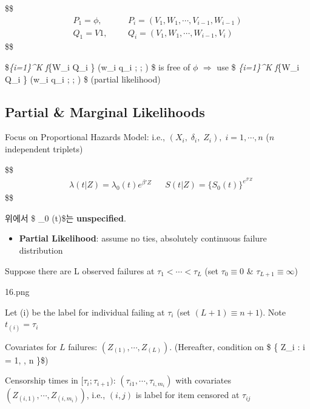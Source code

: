 \documentclass[
]{book}
\providecommand{\tightlist}{%
  \setlength{\itemsep}{0pt}\setlength{\parskip}{0pt}}
\theoremstyle{definition}
\theoremstyle{definition}
\theoremstyle{definition}
\theoremstyle{definition}
\theoremstyle{remark}
\begin{document}
\$\$
\begin{align}


P_1 = \phi,& && P_i =(V_1 , W_1 , \cdots, V_{i-1} , W_{i-1})
\\
Q_1 = V1,& && Q_i =(V_1 , W_1 , \cdots , W_{i-1}, V_i)

\end{align}
\$\$

\$\prod\emph{\{i=1\}\^{}K f}\{W\_i \textbar{} Q\_i \} (w\_i \Big \textbar{} q\_i ; ; \theta) \$ is free of \(\phi\) \(\Rightarrow\) use \$ \prod\emph{\{i=1\}\^{}K f}\{W\_i \textbar{} Q\_i \} (w\_i \Big \textbar{} q\_i ; ; \beta) \$ (partial likelihood)

\hypertarget{partial-marginal-likelihoods}{%
\subsection{Partial \& Marginal Likelihoods}\label{partial-marginal-likelihoods}}

Focus on Proportional Hazards Model: i.e., \((X_i, \; \delta_i, \; Z_i), \; i = 1, \cdots, n\) (\(n\) independent triplets)

\$\$
\begin{align}

&\lambda(t \Big | Z ) = \lambda_0 (t) e^{\beta ' Z} &&S(t \Big | Z) = \Big \{ S_0(t) \Big \}^{e^{\beta ' Z}} \tag{1}

\end{align}
\$\$

위에서 \$ \lambda\_0 (t)\$는 \textbf{unspecified}.

\begin{itemize}
\tightlist
\item
  \textbf{Partial Likelihood}: assume no ties, absolutely continuous failure distribution
\end{itemize}

Suppose there are L observed failures at \(\tau_1 < \cdots < \tau_L\) (set \(\tau_0 \equiv 0\) \& \(\tau_{L+1} \equiv \infty\))

16.png

Let (i) be the label for individual failing at \(\tau_i\) (set \((L + 1) \equiv n + 1\)). Note \(t_{(i)} = \tau_i\)

Covariates for \(L\) failures: \((Z_{(1)}, \cdots, Z_{(L)})\). (Hereafter, condition on \$ \Big \{ Z\_i : i = 1, \cdots, n \Big \}\$)

Censorship times in \([\tau_i; \tau_{i+1})\): \((\tau_{i1}, \cdots, \tau_{i, m_i})\) with covariates \((Z_{(i,1)}, \cdots, Z_{(i,m_i)})\), i.e., \((i, j)\) is label for item censored at \(\tau_{ij}\)
\end{document}
